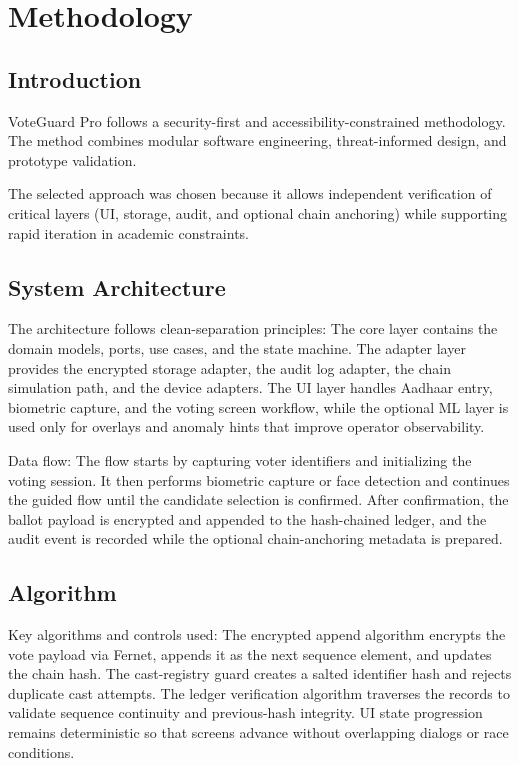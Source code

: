 \chapter{Methodology}

\section{Introduction}
VoteGuard Pro follows a security-first and accessibility-constrained methodology. The method combines modular software engineering, threat-informed design, and prototype validation.

The selected approach was chosen because it allows independent verification of critical layers (UI, storage, audit, and optional chain anchoring) while supporting rapid iteration in academic constraints.

\section{System Architecture}
The architecture follows clean-separation principles:
The core layer contains the domain models, ports, use cases, and the state machine. The adapter layer provides the encrypted storage adapter, the audit log adapter, the chain simulation path, and the device adapters. The UI layer handles Aadhaar entry, biometric capture, and the voting screen workflow, while the optional ML layer is used only for overlays and anomaly hints that improve operator observability.

Data flow:
The flow starts by capturing voter identifiers and initializing the voting session. It then performs biometric capture or face detection and continues the guided flow until the candidate selection is confirmed. After confirmation, the ballot payload is encrypted and appended to the hash-chained ledger, and the audit event is recorded while the optional chain-anchoring metadata is prepared.

\section{Algorithm}
Key algorithms and controls used:
The encrypted append algorithm encrypts the vote payload via Fernet, appends it as the next sequence element, and updates the chain hash. The cast-registry guard creates a salted identifier hash and rejects duplicate cast attempts. The ledger verification algorithm traverses the records to validate sequence continuity and previous-hash integrity. UI state progression remains deterministic so that screens advance without overlapping dialogs or race conditions.


